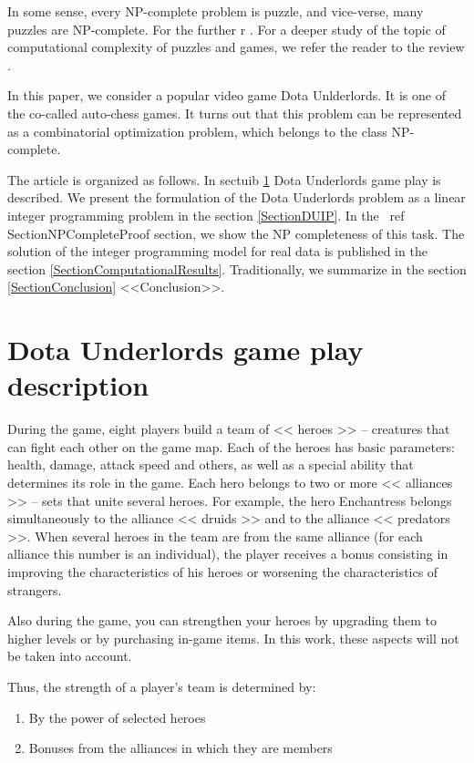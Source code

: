 \documentclass{article}
\begin{document}
In some sense, every NP-complete problem is puzzle, and vice-verse, many puzzles are NP-complete. For the further r . For a deeper study of the topic of computational complexity of puzzles and games, we refer the reader to the review \cite{costa2018computational}.

In this paper, we consider a popular video game Dota Unlderlords. It is one of the co-called  auto-chess games. It turns out that this problem can be represented as a combinatorial optimization problem, which belongs to the class NP-complete.

The article is organized as follows. In sectuib \ref{SectionDUDescription} Dota Underlords game play is described.
We present the formulation of the Dota Underlords problem as a linear integer programming problem in the section \ref{SectionDUIP}. In the \ ref {SectionNPCompleteProof} section, we show the NP completeness of this task. The solution of the integer programming model for real data is published in the section \ref{SectionComputationalResults}. Traditionally, we summarize in the section \ref{SectionConclusion} <<Conclusion>>.

\section{Dota Underlords game play description}
\label{SectionDUDescription}

During the game, eight players build a team of << heroes >> -- creatures that can fight each other on the game map. Each of the heroes has basic parameters: health, damage, attack speed and others, as well as a special ability that determines its role in the game. Each hero belongs to two or more << alliances >> -- sets that unite several heroes. For example, the hero Enchantress belongs simultaneously to the alliance << druids >> and to the alliance << predators >>. When  several heroes in the team are from the same alliance (for each alliance this number is an individual), the player receives a bonus consisting in improving the characteristics of his heroes or worsening the characteristics of strangers.

Also during the game, you can strengthen your heroes by upgrading them to higher levels or by purchasing in-game items. In this work, these aspects will not be taken into account.

Thus, the strength of a player’s team is determined by:

\begin{enumerate}
    \item By the power of selected heroes
    \item Bonuses from the alliances in which they are members
\end{enumerate}
\end{document}
